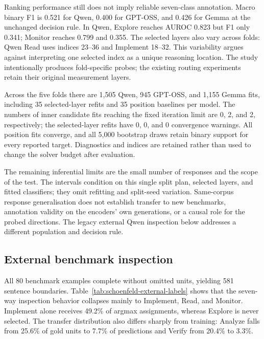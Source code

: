Ranking performance still does not imply reliable seven-class annotation.
Macro binary F1 is 0.521 for Qwen, 0.400 for GPT-OSS, and 0.426 for
Gemma at the unchanged decision rule. In Qwen, Explore reaches AUROC 0.823
but F1 only 0.341; Monitor reaches 0.799 and 0.355. The selected layers also
vary across folds: Qwen Read uses indices 23--36 and Implement 18--32.
This variability argues against interpreting one selected index as a unique
reasoning location. The study intentionally produces fold-specific probes;
the existing routing experiments retain their original measurement layers.

Across the five folds there are 1,505 Qwen, 945 GPT-OSS, and 1,155 Gemma
fits, including 35 selected-layer refits and 35 position baselines per model.
The numbers of inner candidate fits reaching the fixed iteration limit are
0, 2, and 2, respectively; the selected-layer refits
have 0, 0, and 0 convergence warnings.
All position fits converge, and all 5,000 bootstrap draws retain binary
support for every reported target. Diagnostics and indices are retained
rather than used to change the solver budget after evaluation.

The remaining inferential limits are the small number of responses and the
scope of the test. The intervals condition on this single split plan,
selected layers, and fitted classifiers; they omit refitting and split-seed
variation. Same-corpus response generalisation does not establish transfer
to new benchmarks, annotation validity on the encoders' own generations,
or a causal role for the probed directions. The legacy external Qwen
inspection below addresses a different population and decision rule.

\subsection{External benchmark inspection}
All 80 benchmark examples complete without omitted units, yielding 581
sentence boundaries.  Table~\ref{tab:schoenfeld-external-labels} shows that
the seven-way inspection behavior collapses mainly to Implement, Read, and
Monitor.  Implement alone receives 49.2\% of argmax assignments, whereas
Explore is never selected.  The transfer distribution also differs sharply
from training: Analyze falls from 25.6\% of gold units to 7.7\% of predictions
and Verify from 20.4\% to 3.3\%.

